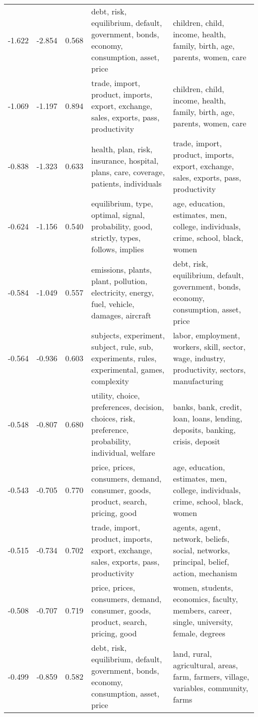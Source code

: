 \begin{tabular}{cccp{5cm}p{5cm}}
-1.622 & -2.854 & 0.568 & debt, risk, equilibrium, default, government, bonds, economy, consumption, asset, price & children, child, income, health, family, birth, age, parents, women, care \\
-1.069 & -1.197 & 0.894 & trade, import, product, imports, export, exchange, sales, exports, pass, productivity & children, child, income, health, family, birth, age, parents, women, care \\
-0.838 & -1.323 & 0.633 & health, plan, risk, insurance, hospital, plans, care, coverage, patients, individuals & trade, import, product, imports, export, exchange, sales, exports, pass, productivity \\
-0.624 & -1.156 & 0.540 & equilibrium, type, optimal, signal, probability, good, strictly, types, follows, implies & age, education, estimates, men, college, individuals, crime, school, black, women \\
-0.584 & -1.049 & 0.557 & emissions, plants, plant, pollution, electricity, energy, fuel, vehicle, damages, aircraft & debt, risk, equilibrium, default, government, bonds, economy, consumption, asset, price \\
-0.564 & -0.936 & 0.603 & subjects, experiment, subject, rule, sub, experiments, rules, experimental, games, complexity & labor, employment, workers, skill, sector, wage, industry, productivity, sectors, manufacturing \\
-0.548 & -0.807 & 0.680 & utility, choice, preferences, decision, choices, risk, preference, probability, individual, welfare & banks, bank, credit, loan, loans, lending, deposits, banking, crisis, deposit \\
-0.543 & -0.705 & 0.770 & price, prices, consumers, demand, consumer, goods, product, search, pricing, good & age, education, estimates, men, college, individuals, crime, school, black, women \\
-0.515 & -0.734 & 0.702 & trade, import, product, imports, export, exchange, sales, exports, pass, productivity & agents, agent, network, beliefs, social, networks, principal, belief, action, mechanism \\
-0.508 & -0.707 & 0.719 & price, prices, consumers, demand, consumer, goods, product, search, pricing, good & women, students, economics, faculty, members, career, single, university, female, degrees \\
-0.499 & -0.859 & 0.582 & debt, risk, equilibrium, default, government, bonds, economy, consumption, asset, price & land, rural, agricultural, areas, farm, farmers, village, variables, community, farms \\

\end{tabular}
